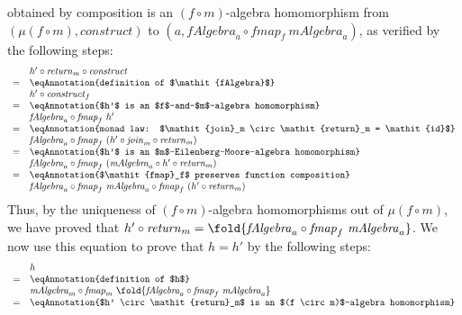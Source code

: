 \begin{proof*}
\begin{enumerate}
    obtained by composition is an $(f \circ m)$-algebra homomorphism
    from $(\mu(f \circ m), \mathit{construct})$ to $(a, \mathit{fAlgebra}_a
    \circ \mathit{fmap}_f~\mathit{mAlgebra}_a)$, as verified by the
    following steps:
    \begin{displaymath}
      \begin{array}{cl}
        & h' \circ \mathit{return}_m \circ \mathit{construct} \\
        =&\eqAnnotation{definition of $\mathit{fAlgebra}$} \\
        & h' \circ \mathit{construct}_f \\
        =&\eqAnnotation{$h'$ is an $f$-and-$m$-algebra homomorphism} \\
        & \mathit{fAlgebra}_a \circ \mathit{fmap}_f~h' \\
        =&\eqAnnotation{monad law: $\mathit{join}_m \circ \mathit{return}_m = \mathit{id}$} \\
        & \mathit{fAlgebra}_a \circ \mathit{fmap}_f~(h' \circ \mathit{join}_m \circ \mathit{return}_m) \\
        =&\eqAnnotation{$h'$ is an $m$-Eilenberg-Moore-algebra homomorphism} \\
        & \mathit{fAlgebra}_a \circ \mathit{fmap}_f~(\mathit{mAlgebra}_a \circ h' \circ \mathit{return}_m) \\
        =&\eqAnnotation{$\mathit{fmap}_f$ preserves function composition} \\
        & \mathit{fAlgebra}_a \circ \mathit{fmap}_f~\mathit{mAlgebra}_a \circ \mathit{fmap}_f~(h' \circ \mathit{return}_m)
      \end{array}
    \end{displaymath}
    Thus, by the uniqueness of $(f \circ m)$-algebra homomorphisms out
    of $\mu(f \circ m)$, we have proved that $h' \circ
    \mathit{return}_m = \fold{\mathit{fAlgebra}_a \circ
      \mathit{fmap}_f~\mathit{mAlgebra}_a}$. We now use this equation
    to prove that $h=h'$ by the following steps:
    \begin{displaymath}
      \begin{array}{cl}
        & h \\
        =&\eqAnnotation{definition of $h$} \\
        &\mathit{mAlgebra}_m \circ \mathit{fmap}_m~\fold{\mathit{fAlgebra}_a \circ \mathit{fmap}_f~\mathit{mAlgebra}_a} \\
        =&\eqAnnotation{$h' \circ \mathit{return}_m$ is an $(f \circ m)$-algebra homomorphism} \\

\end{array}
\end{displaymath}
\end{enumerate}
\end{proof*}
